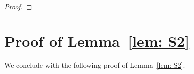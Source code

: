 \documentclass[twoside,11pt]{article}
\newcommand{\bs}{\boldsymbol}
\newcommand{\0}{\bs{0}}
\newcommand{\rbra}[1]{\ensuremath{\left( #1 \right)}} %
\newcommand{\bra}[1]{\ensuremath{\left\{ #1 \right\}}} %
\begin{document}
\begin{proof}
\end{proof}

\section{Proof of  Lemma~\ref{lem: S2}} %
\label{A_S2_bound}

We conclude with the following proof of Lemma~\ref{lem: S2}.
\end{document}
